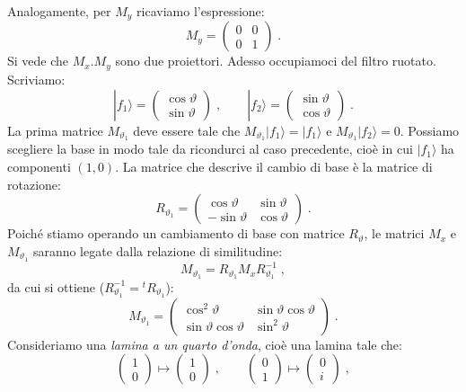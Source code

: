 \documentclass[10pt,a4paper]{report}
\theoremstyle{definition}
\numberwithin{equation}{section}
\newcommand{\ket}{\rangle}
\begin{document}
Analogamente, per $M_y$ ricaviamo l'espressione:
$$
M_y=\left(
\begin{matrix}
0 & 0 \\
0 & 1
\end{matrix}\right)\;.
$$
Si vede che $M_x.M_y$ sono due proiettori. Adesso occupiamoci del filtro ruotato. Scriviamo:
$$
|f_1\ket=\left(
\begin{matrix}
\cos\vartheta \\
\sin\vartheta
\end{matrix}\right)\;, \qquad
|f_2\ket=\left(
\begin{matrix}
\sin\vartheta \\
\cos\vartheta
\end{matrix}\right)\;.
$$
La prima matrice $M_{\vartheta_1}$ deve essere tale che $M_{\vartheta_1}|f_1\ket=|f_1\ket$ e $M_{\vartheta_1}|f_2\ket=0$. Possiamo scegliere la base in modo tale da ricondurci al caso precedente, cioè in cui $|f_1\ket$ ha componenti $(1,0)$. La matrice che descrive il cambio di base è la matrice di rotazione:
$$
R_{\vartheta_1}=\left(
\begin{matrix}
\cos\vartheta & \sin\vartheta \\
-\sin\vartheta & \cos\vartheta
\end{matrix}\right)\;.
$$
Poiché stiamo operando un cambiamento di base con matrice $R_{\vartheta}$, le matrici $M_x$ e $M_{\vartheta_1}$ saranno legate dalla relazione di similitudine:
$$
M_{\vartheta_1}=R_{\vartheta_1}M_xR_{\vartheta_1}^{-1}\;,
$$
da cui si ottiene ($R_{\vartheta_1}^{-1}={}^tR_{\vartheta_1}$):
$$
M_{\vartheta_1}=\left(
\begin{matrix}
\cos^2\vartheta & \sin\vartheta\cos\vartheta \\
\sin\vartheta\cos\vartheta & \sin^2\vartheta
\end{matrix}\right)\;.
$$
Consideriamo una \textit{lamina a un quarto d'onda}, cioè una lamina tale che:
$$
\left(\begin{matrix}
1 \\
0
\end{matrix}\right) \longmapsto \left(
\begin{matrix}
1 \\
0
\end{matrix}\right)\;, \qquad
\left(\begin{matrix}
0 \\
1
\end{matrix}\right) \longmapsto \left(
\begin{matrix}
0 \\
i
\end{matrix}\right)\;,
$$
\end{document}
